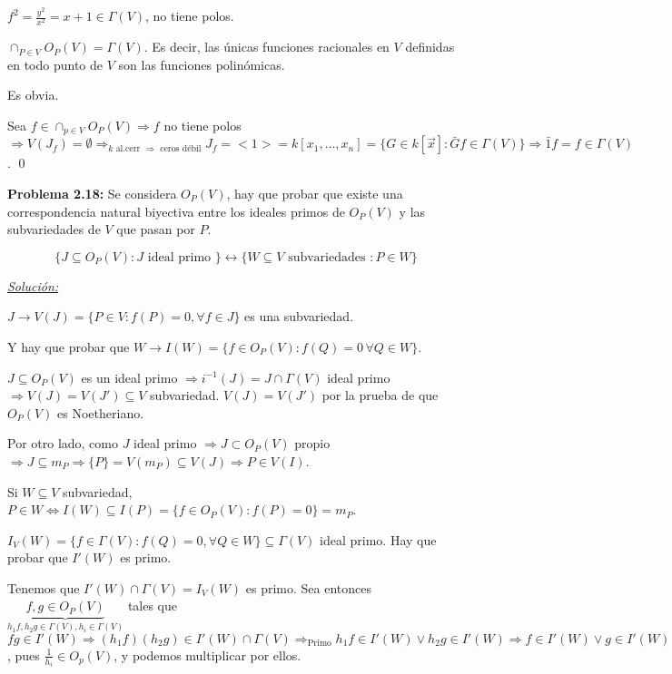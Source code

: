 $f^2=\frac{y^2}{x^2}=x+1\in \Gamma(V)$, no tiene polos.

\begin{Prop}
$\cap_{P\in V}O_P(V)=\Gamma(V)$. Es decir, las únicas funciones racionales en $V$ definidas en todo punto de $V$ son las funciones polinómicas. 
\end{Prop}

\begin{Dem}
\framebox{$\supseteq $} Es obvia. 

\framebox{$\subseteq $} Sea $f\in \cap_{p\in V}O_P(V) \Rightarrow f$ no tiene polos $\Rightarrow V(J_f)=\emptyset \Rightarrow_{k \text{ al.cerr }\Rightarrow \text{ ceros débil}} J_f=<1>=k[x_1,\dots,x_n]=\{G\in k[\vec{x}]: \bar{G}f\in \Gamma(V) \} \Rightarrow \bar{1}f=f\in \Gamma(V)$. \qed
\end{Dem}

\textbf{Problema 2.18: } Se considera $O_P(V)$, hay que probar que existe una correspondencia natural biyectiva entre los ideales primos de $O_P(V)$ y las subvariedades de $V$ que pasan por $P$.

$$\{J\subseteq O_P(V):J \text{ ideal primo } \} \leftrightarrow \{W\subseteq V \text{ subvariedades } : P\in W \} $$

\underline{\textit{Solución: }}

$J \rightarrow V(J)=\{P\in V : f(P)=0,\forall f\in J\}$ es una subvariedad.

Y hay que probar que $W \rightarrow I(W) = \{f\in O_P(V):f(Q)=0\,\forall Q\in W \}$.

$J\subseteq O_P(V)$ es un ideal primo $\Rightarrow i^{-1}(J)=J\cap \Gamma(V)$ ideal primo $\Rightarrow V(J)=V(J')\subseteq V$ subvariedad.  $V(J)=V(J')$ por la prueba de que $O_P(V)$ es Noetheriano.

Por otro lado, como $J$ ideal primo $\Rightarrow J\subset O_P(V)$ propio $\Rightarrow J\subseteq m_P \Rightarrow \{ P \}=V(m_P)\subseteq V(J) \Rightarrow P\in V(I)$.

Si $W\subseteq V$ subvariedad, $P\in W \Leftrightarrow I(W)\subseteq I(P)=\{f\in O_P(V): f(P)=0\}=m_P$.

$I_V(W)=\{ f\in \Gamma(V): f(Q)=0, \forall Q\in W\}\subseteq \Gamma(V)$ ideal primo.  Hay que probar que $I'(W)$ es primo. 

Tenemos que $I'(W)\cap  \Gamma(V)=I_V(W)$ es primo. Sea entonces $\underbrace{f,g\in O_P(V)}_{h_1f,h_2g\in \Gamma(V), h_i\in \Gamma(V)}$ tales que $fg\in I'(W) \Rightarrow (h_1f)(h_2g)\in I'(W)\cap \Gamma(V) \Rightarrow_{\text{Primo}} h_1f\in I'(W) \vee h_2g\in I'(W) \Rightarrow f\in I'(W) \vee g \in I'(W)$, pues $\frac{1}{h_i}\in O_p(V)$, y podemos multiplicar por ellos.


